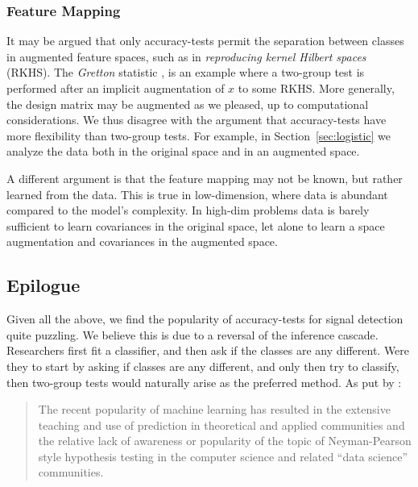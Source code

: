 \documentclass[oupdraft]{bio}
\begin{document}
\subsubsection{Feature Mapping}
It may be argued that only accuracy-tests permit the separation between classes in augmented feature spaces, such as in \emph{reproducing kernel Hilbert spaces} (RKHS).
The \emph{Gretton} statistic \citep{gretton_kernel_2012-1}, is an example where a two-group test is performed after an implicit augmentation of $x$ to some RKHS.
More generally, the design matrix may be augmented as we pleased, up to computational considerations.
We thus disagree with the argument that accuracy-tests have more flexibility than two-group tests. 
For example, in Section~\ref{sec:logistic} we analyze the data both in the original space and in an augmented space.

A different argument is that the feature mapping may not be known, but rather learned from the data. 
This is true in low-dimension, where data is abundant compared to the model's complexity.
In high-dim problems data is barely sufficient to learn covariances in the original space, let alone to learn a space augmentation and covariances in the augmented space.  





\subsection{Epilogue}
Given all the above, we find the popularity of accuracy-tests for signal detection quite puzzling. 
We believe this is due to a reversal of the inference cascade. 
Researchers first fit a classifier, and then ask if the classes are any different.
Were they to start by asking if classes are any different, and only then try to classify, then two-group tests would naturally arise as the preferred method. 
As put by \cite{ramdas_classification_2016}:
\begin{quote}
	The recent popularity of machine learning has resulted in the extensive teaching and use
	of prediction in theoretical and applied communities and the relative lack of awareness or
	popularity of the topic of Neyman-Pearson style hypothesis testing in the computer science
	and related ``data science'' communities.
\end{quote}
\end{document}
